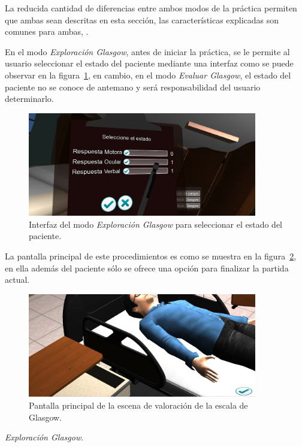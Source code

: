 La reducida cantidad de diferencias entre ambos modos de la práctica permiten
que ambas sean descritas en esta sección, las características explicadas son
comunes para ambas, .

En el modo \emph{Exploración Glasgow}, antes de iniciar la práctica, se le
permite al usuario seleccionar el estado del paciente mediante una interfaz 
como se puede observar en la figura~\ref{fig:glasgow_seleccion}, en
cambio, en el modo \emph{Evaluar Glasgow}, el estado del paciente no se conoce
de antemano y será responsabilidad del usuario determinarlo.

\begin{figure}[H]
\centering
\includegraphics[width=10cm]{solucion/images/glasgow_seleccion.jpg}
\caption{Interfaz del modo \emph{Exploración Glasgow} para seleccionar el estado del 
paciente.}
\label{fig:glasgow_seleccion}
\end{figure}

La pantalla principal de este procedimientos es como se muestra en la
figura~\ref{fig:glasgow_principal}, en ella además del paciente sólo se ofrece
una opción para finalizar la partida actual.

\begin{figure}[H]
\centering
\includegraphics[width=10cm]{solucion/images/glasgow_principal.jpg}
\caption{Pantalla principal de la escena de valoración de la escala de Glasgow.}
\label{fig:glasgow_principal}
\end{figure}

\emph{Exploración Glasgow}.

